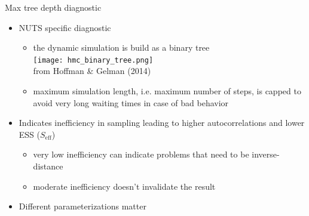 \documentclass[finnish,english,t]{beamer}
\def\eff{\mathrm{eff}}
\begin{document}
\begin{frame}{Max tree depth diagnostic}

  \vspace{-0.5\baselineskip}
  \begin{itemize}
  \item NUTS specific diagnostic
    \begin{itemize}
    \item the dynamic simulation is build as a binary tree\\
      \texttt{[image: hmc\_binary\_tree.png]}\\ {\scriptsize from Hoffman \& Gelman (2014)}      
    \item<2-> maximum simulation length, i.e. maximum number of steps,
      is capped to avoid very long waiting times in case of bad
      behavior
    \end{itemize}
  \item<3-> Indicates inefficiency in sampling leading to higher
    autocorrelations and lower ESS ($S_{\eff}$)
    \begin{itemize}
    \item very low inefficiency can indicate problems that need to be
      inverse-distance
    \item moderate inefficiency doesn't invalidate the result
    \end{itemize}
  \item<4-> Different parameterizations matter
  \end{itemize}

  
\end{frame}
\end{document}
